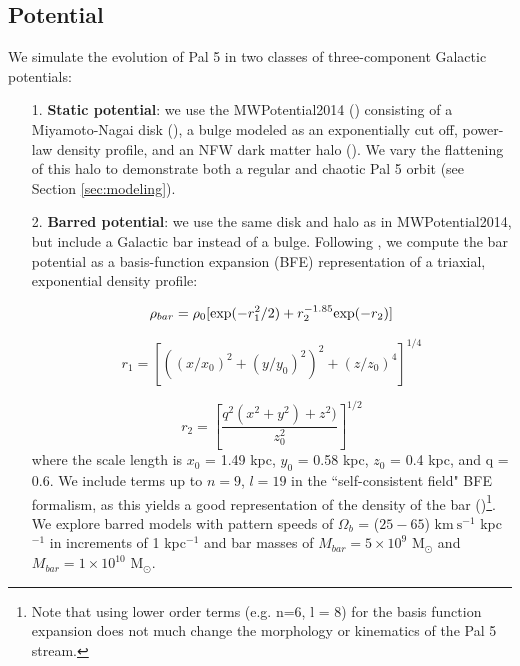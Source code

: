 \documentclass[modern]{aastex62}
\newcommand{\msun}{\textrm{M}_\odot}
\newcommand{\kms}{\ensuremath{\textrm{km}~\textrm{s}^{-1}}}
\begin{document}
\subsection{Potential}
\label{sec:potential}
We simulate the evolution of Pal 5 in two classes of three-component Galactic potentials: 

\begin{itemize}
\item[1.] {\bf Static potential}: we use the {\small MWPotential2014} (\citealt{Bovy:2015}) consisting of a Miyamoto-Nagai disk (\citealt{Miyamoto:1975}), a bulge modeled as an exponentially cut off, power-law density profile, and an NFW dark matter halo (\citealt{Navarro:1996}). We vary the flattening of this halo to demonstrate both a regular and chaotic Pal 5 orbit (see Section \ref{sec:modeling}). 

\item[2.] {\bf  Barred potential}: we use the same disk and halo as in {\small MWPotential2014}, but include a Galactic bar instead of a bulge. Following \citet{wang:2012}, we compute the bar potential as a basis-function expansion (BFE) representation of a triaxial, exponential density profile:

\begin{equation}
\rho_{bar} = \rho_0 [{\rm exp} (-r^2_1/2) + r_2^{-1.85} {\rm exp}(-r_2) ]
\end{equation}

\begin{equation}
r_1 = \left[\left((x/x_0)^2 + (y/y_0)^2\right)^2 +( z/z_0)^4\right]^{1/4}
\end{equation}

\begin{equation}
r_2 = \left[\frac{q^2(x^2 + y^2) + z^2)}{z_0^2}\right]^{1/2}
\end{equation}
where the scale length is $x_0$ = 1.49 kpc, $y_0$ = 0.58 kpc, $z_0$ = 0.4 kpc, and q = 0.6. We include terms up to $n=9$, $l=19$ in the ``self-consistent field" BFE formalism, as this yields a good representation of the density of the bar (\citealt{Banik:2019})\footnote{Note that using lower order terms (e.g. n=6, l = 8) for the basis function expansion does not much change the morphology or kinematics of the Pal 5 stream.}. We explore barred models with pattern speeds of $\Omega_b$ = ($25 - 65$) $\kms$ kpc$^{-1}$ in increments of 1 kpc$^{-1}$ and bar masses of $M_{bar} = 5 \times 10^{9}$ $\msun$ and $M_{bar} = 1 \times 10^{10}$ $\msun$.
\end{itemize}
\end{document}
